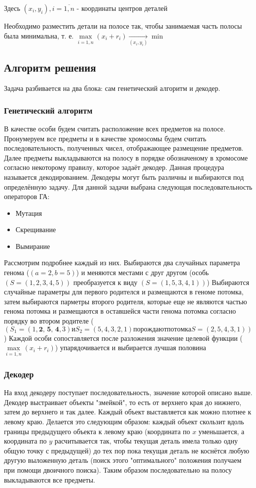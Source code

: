 Здесь ${(x_{i}, y_{i}),   i = \overline{1, n}}$ - координаты центров деталей

Необходимо разместить детали на полосе так, чтобы занимаемая часть полосы была минимальна, т. е. ${\max\limits_{i = \overline{1, n}}(x_{i} + r_{i})\xrightarrow[{(x_i, y_i)}]{} 
\min}$
\subsection{Алгоритм решения}
Задача разбивается на два блока: сам генетический алгоритм и декодер.
\subsubsection{Генетический алгоритм}
В качестве особи будем считать расположение всех предметов на полосе. Пронумеруем все предметы и в качестве хромосомы будем считать последовательность, полученных чисел, отображающее размещение предметов. Далее предметы выкладываются на полосу в порядке обозначеному в хромосоме согласно некоторому правилу, которое задаёт декодер. Данная процедура называется декодированием. Декодеры могут быть различны и выбираются под определённую задачу. Для данной задачи выбрана следующая последовательность операторов ГА:
\begin{itemize}
\item Мутация
\item Скрещивание
\item Вымирание
\end{itemize}
Рассмотрим подробнее каждый из них.
Выбираются два случайных параметра генома ($(a = 2, b = 5)$) и меняются местами с друг другом (особь $(S = (1, 2, 3, 4, 5) )$ преобразуется к виду $(S = (1, 5, 3, 4, 1) )$)
Выбираются случайные параметры для первого родителся и размещаются в геноме потомка, затем выбираются парметры второго родителя, которые еще не являются частью генома потомка и размещаются в оставшейся части генома потомка согласно порядку во втором родителе ($(S_{1} = (1, \textbf{2, 5, 4}, 3) и S_{2} = (5, 4, 3, 2, 1) порождают потомка S = (2, 5, 4, 3, 1))$)
Каждой особи сопоставляется после разложения значение целевой функции ( ${\max\limits_{i = \overline{1, n}}(x_{i} + r_{i})}$)  упарядочивается и выбирается лучшая половина
\subsubsection{Декодер}
На вход декодеру поступает последовательность, значение которой описано выше. Декодер выстраивает объекты "змейкой", то есть от верхнего края до нижнего, затем до верхнего и так далее. Каждый объект выставляется как можно плотнее к левому краю. Делается это следующим образом: каждый объект скользит вдоль границы предыдущего объекта к левому краю (координата по $x$ уменьшается, а координата по $y$ расчитывается так, чтобы текущая деталь имела только одну общую точку с предыдущей) до тех пор пока текущая деталь не коснётся любую другую выложенную деталь (поиск этого "оптимального" положения получаем при помощи двоичного поиска). Таким образом последовательно на полосу выкладываются все предметы. 

